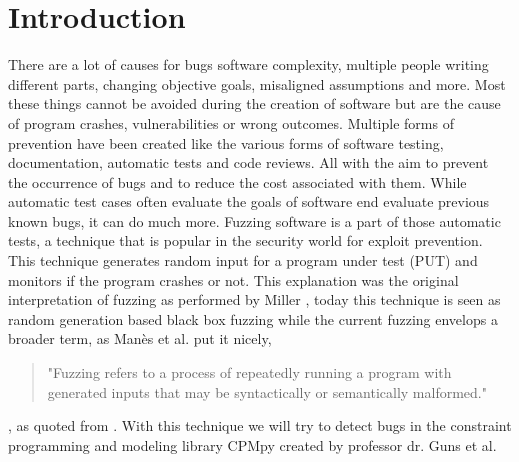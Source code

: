 \chapter{Introduction}
\label{cha:1:intro}
\label{intro:intro}
There are a lot of causes for bugs software complexity, multiple people writing different parts, changing objective goals, misaligned assumptions and more. Most these things cannot be avoided during the creation of software but are the cause of program crashes, vulnerabilities or wrong outcomes. Multiple forms of prevention have been created like the various forms of software testing, documentation, automatic tests and code reviews. All with the aim to prevent the occurrence of bugs and to reduce the cost associated with them. While automatic test cases often evaluate the goals of software end evaluate previous known bugs, it can do much more. Fuzzing software is a part of those automatic tests, a technique that is popular in the security world for exploit prevention. This technique generates random input for a program under test (PUT) and monitors if the program crashes or not. This explanation was the original interpretation of fuzzing as performed by Miller \cite{4originalFuzzingUnixUtils}, today this technique is seen as random generation based black box fuzzing while the current fuzzing envelops a broader term, as Man\`es et al. \cite{13manes2019survey} put it nicely,
\begin{quote}
"Fuzzing refers to a process of repeatedly running a program with generated inputs that may be syntactically or semantically malformed."
\end{quote}, as quoted from \cite{13manes2019survey}.
With this technique we will try to detect bugs in the constraint programming and modeling library CPMpy \cite{17guns2019increasing} created by professor dr. Guns et al.

